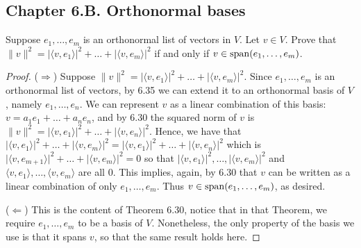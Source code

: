\subsection*{Chapter 6.B. Orthonormal bases}


\begin{exercise}{2}
  Suppose $e_1,\dots,e_m$ is an orthonormal list of vectors in $V$. Let $v\in V$. Prove that $\lVert v\rVert^2 =\lvert\langle v,e_1\rangle\rvert^2+\dots+\lvert\langle v,e_m\rangle\rvert^2$ if and only if $v\in\operatorname*{span}(e_1,\dots,e_m)$.
\end{exercise}
\begin{proof}
 ($\Rightarrow$) Suppose $\lVert v\rVert^2 =\lvert\langle v,e_1\rangle\rvert^2+\dots+\lvert\langle v,e_m\rangle\rvert^2$. Since $e_1,\dots,e_m$ is an orthonormal list of vectors, by 6.35 we can extend it to an orthonormal basis of $V$, namely $e_1,\dots,e_n$. We can represent $v$ as a linear combination of this basis: $v=a_1e_1+\dots+a_ne_n$, and by 6.30 the squared norm of $v$ is $\lVert v\rVert^2 =\lvert\langle v,e_1\rangle\rvert^2+\dots+\lvert\langle v,e_n\rangle\rvert^2$. Hence, we have that $\lvert\langle v,e_1\rangle\rvert^2+\dots+\lvert\langle v,e_m\rangle\rvert^2 =\lvert\langle v,e_1\rangle\rvert^2+\dots+\lvert\langle v,e_n\rangle\rvert^2$ which is $\lvert\langle v,e_{m+1}\rangle\rvert^2+\dots+\lvert\langle v,e_m\rangle\rvert^2 =0$ so that $\lvert\langle v,e_1\rangle\rvert^2,\dots,\lvert\langle v,e_m\rangle\rvert^2$ and $\langle v,e_1\rangle,\dots,\langle v,e_m\rangle$ are all 0. This implies, again, by 6.30 that $v$ can be written as a linear combination of only $e_1,\dots,e_m$. Thus $v\in\operatorname*{span}(e_1,\dots,e_m)$, as desired.

 ($\Leftarrow$) This is the content of Theorem 6.30, notice that in that Theorem, we require $e_1,\dots,e_m$ to be a basis of $V$. Nonetheless, the only property of the basis we use is that it spans $v$, so that the same result holds here.
\end{proof}

